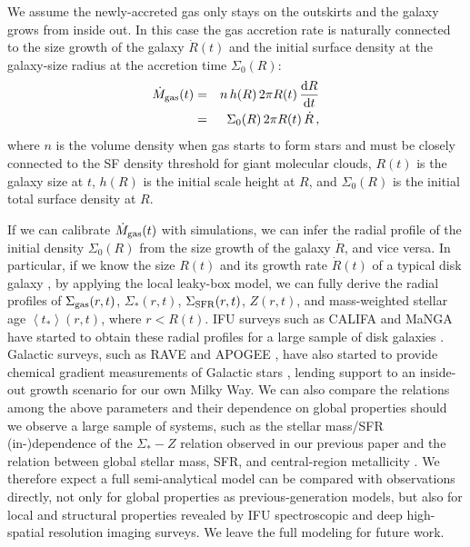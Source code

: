 \documentclass[12pt, appendixfloats, numberedappendix]{emulateapj}
\begin{document}
We assume the newly-accreted gas only stays on the outskirts and the galaxy grows from inside out. 
In this case the gas accretion rate is naturally connected to the size growth of the galaxy $\dot{R}(t)$ and the initial surface density 
at the galaxy-size radius at the accretion time $\Sigma_{0}(R)$:
\begin{eqnarray}
\dot{M}_{\rm gas} (t) &  = & n\,h(R)\,2\pi R(t)\, \frac{{\rm d} R}{{\rm d} t} \\
 & = & \Sigma_0(R)\,2\pi R(t)\,\dot{R}\,\mathrm{,}
\label{eq:profilesize}
\end{eqnarray}
\noindent where $n$ is the volume density when gas starts to form stars and must be closely connected to the SF density threshold for giant molecular clouds, 
$R(t)$ is the galaxy size at $t$, $h(R)$ is the initial scale height at $R$, and $\Sigma_0(R)$ is the initial total surface density at $R$.

If we can calibrate $\dot{M}_{\rm gas} (t)$ with simulations, 
we can infer the radial profile of the initial density $\Sigma_0(R)$ from the size growth of the galaxy $\dot{R}$, and vice versa.
In particular, if we know the size $R(t)$ and its growth rate $\dot{R}(t)$ of a typical disk galaxy \citep[\eg][]{vandokkum13a, vanderwel14a}, 
by applying the local leaky-box model, we can fully derive the radial profiles of $\Sigma_{\rm gas}(r,t)$, $\Sigma_{*}(r,t)$, $\Sigma_{\rm SFR} (r,t)$, 
$Z(r,t)$, and mass-weighted stellar age $\left<t_*\right> (r,t)$, where $r<R(t)$. 
IFU surveys such as CALIFA and MaNGA have started to obtain these radial profiles for a large sample of 
disk galaxies \citep[\eg][]{sanchez13a, perez13a}.
Galactic surveys, such as RAVE \citep{steinmetz06a} and APOGEE \citep{majewski16a}, have also started to provide 
chemical gradient measurements of Galactic stars \citep[\eg][]{boeche13a, hayden14a, ness16a}, 
lending support to an inside-out growth scenario for our own Milky Way.
We can also compare the relations among the above parameters and their dependence on global properties should we observe a large sample of systems, 
such as the stellar mass/SFR (in-)dependence of the $\Sigma_{*}-Z$ relation observed in our previous paper \citep[\eg][]{barrera16a} 
and the relation between global stellar mass, SFR, and central-region metallicity \citep[\eg][]{mannucci10a, laralopez10a, sanchez13a, salim14a, salim15a, bothwell16a}.
We therefore expect a full semi-analytical model can be compared with observations directly,
not only for global properties as previous-generation models, but also for local and structural properties revealed 
by IFU spectroscopic and deep high-spatial resolution imaging surveys. 
We leave the full modeling for future work.
\end{document}
